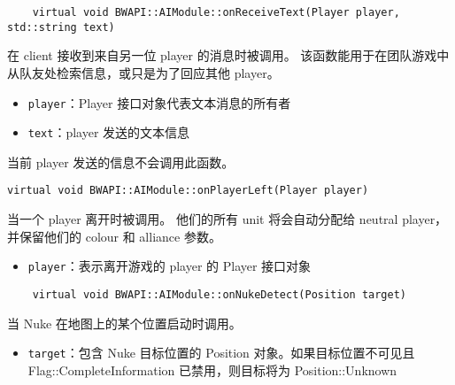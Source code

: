 \begin{tcolorbox}[colback=white, colframe=black!60!white, title=onReceiveText(), arc=0mm]
    \begin{verbatim}
    virtual void BWAPI::AIModule::onReceiveText(Player player, std::string text)
    \end{verbatim}
    在 client 接收到来自另一位 player 的消息时被调用。  
    该函数能用于在团队游戏中从队友处检索信息，或只是为了回应其他 player。
    \begin{parameter}
        \begin{itemize}
            \item \texttt{player}：Player 接口对象代表文本消息的所有者
            \item \texttt{text}：player 发送的文本信息
        \end{itemize}
    \end{parameter}
    \begin{note}
        当前 player 发送的信息不会调用此函数。
    \end{note}
\end{tcolorbox}
    
\begin{tcolorbox}[colback=white, colframe=black!60!white, title=onPlayerLeft(), arc=0mm]
\begin{verbatim}
virtual void BWAPI::AIModule::onPlayerLeft(Player player)
\end{verbatim}
当一个 player 离开时被调用。  
他们的所有 unit 将会自动分配给 neutral player，并保留他们的 colour 和 alliance 参数。
\begin{parameter}
    \begin{itemize}
        \item \texttt{player}：表示离开游戏的 player 的 Player 接口对象
    \end{itemize}
\end{parameter}
\end{tcolorbox}

\begin{tcolorbox}[colback=white, colframe=black!60!white, title=onNukeDetect(), arc=0mm]
    \begin{verbatim}
    virtual void BWAPI::AIModule::onNukeDetect(Position target)
    \end{verbatim}
    当 Nuke 在地图上的某个位置启动时调用。
    \begin{parameter}
        \begin{itemize}
            \item \texttt{target}：包含 Nuke 目标位置的 Position 对象。如果目标位置不可见且 Flag::CompleteInformation 已禁用，则目标将为 Position::Unknown
        \end{itemize}
    \end{parameter}
\end{tcolorbox}
    

